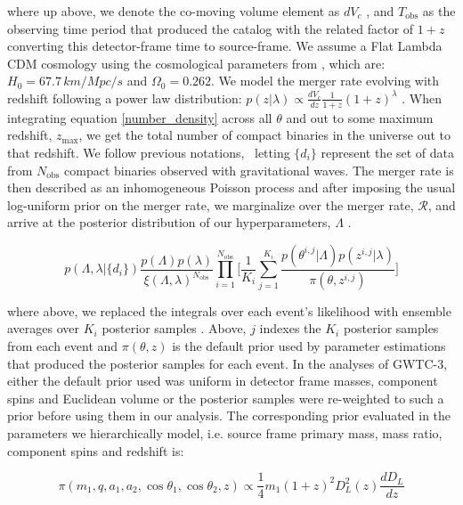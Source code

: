\noindent
where up above, we denote the co-moving volume element as $dV_c$ \citep{hogg_cosmo}, and $T_\mathrm{obs}$ as the observing time period that produced the 
catalog with the related factor of $1+z$ converting this detector-frame time to source-frame. We assume a Flat Lambda CDM cosmology using 
the cosmological parameters from \citet{Planck2015}, which are: $H_0=67.7\,km/Mpc/s$ and $\Omega_0=0.262$. We model the merger rate evolving with redshift following a power law distribution: 
$p(z|\lambda) \propto \frac{dV_c}{dz}\frac{1}{1+z}(1+z)^\lambda$ \citep{Fishbach_2018redshift}. When integrating equation \ref{number_density} across all $\theta$
and out to some maximum redshift, $z_\mathrm{max}$, we get the total number of compact binaries in the universe out to that redshift. We follow previous notations, \
letting $\{d_i\}$ represent the set of data from $N_\mathrm{obs}$ compact binaries observed with gravitational waves. The merger rate is then described as an inhomogeneous 
Poisson process and after imposing the usual log-uniform prior on the merger rate, we marginalize over the merger rate, $\mathcal{R}$, and arrive at the posterior
distribution of our hyperparameters, $\Lambda$ \citep{Mandel_2019, Vitale_2021}.

\begin{equation}
    p\left(\Lambda, \lambda | \{d_i\}\right) \frac{p(\Lambda)p(\lambda)}{\xi(\Lambda,\lambda)^{N_\mathrm{obs}}} \prod_{i=1}^{N_\mathrm{obs}} \bigg[ \frac{1}{K_i} \sum_{j=1}^{K_i} \frac{p(\theta^{i,j}|\Lambda)p(z^{i,j}|\lambda)}{\pi(\theta, z^{i,j})} \bigg]
\end{equation}

\noindent
where above, we replaced the integrals over each event's likelihood with ensemble averages over $K_i$ posterior samples \citep{gwtc3DATA}. Above, $j$
indexes the $K_i$ posterior samples from each event and $\pi(\theta, z)$ is the default prior used by parameter estimations that 
produced the posterior samples for each event. In the analyses of GWTC-3, either the default prior used was uniform in detector frame masses, 
component spins and Euclidean volume or the posterior samples were re-weighted to such a prior before using them in our analysis. 
The corresponding prior evaluated in the parameters we hierarchically model, i.e. source frame primary mass, mass ratio, component spins and redshift is:

\begin{equation}
    \pi(m_1, q, a_1, a_2, \cos{\theta_1}, \cos{\theta_2}, z) \propto \frac{1}{4} m_1 (1+z)^2 D_L^2(z) \frac{dD_L}{dz}
\end{equation}

